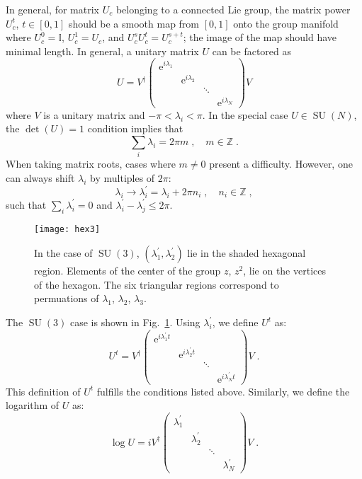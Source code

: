\documentclass[preprint,aps,prd]{revtex4-2}
\newcommand{\da}{\dagger}  %
\newcommand{\be}{\begin{equation}}
\newcommand{\eq}{\end{equation}}
\newcommand{\integer}{\mathbb{Z}}       %
\DeclareMathOperator{\SU}{SU}
\begin{document}
In general, for matrix $U_c$ belonging to a connected Lie group,
the matrix power $U_c^t$, $t\in[0,1]$ should be a
smooth map from $[0,1]$ onto the group manifold where
$U_c^0=\mathbb{I}$, $U_c^1=U_c$, and $U_c^s U_c^t = U_c^{s+t}$;
the image of the map should have minimal length.
In general, a unitary matrix $U$ can be factored as
%
\be
U = V^\da \begin{pmatrix}
    \mathrm{e}^{i \lambda_1} & & &\\
    & \mathrm{e}^{i \lambda_2} & &\\
    & & \ddots & \\
    & & & \mathrm{e}^{i \lambda_N}\end{pmatrix} V
\eq
%
where $V$ is a unitary matrix and $-\pi < \lambda_i < \pi$.
In the special case $U \in \SU(N)$, the $\det(U)=1$ condition implies that
\be
\sum_i \lambda_i = 2 \pi m\;, \quad m\in\integer \;.
\eq
When taking matrix roots, cases where $m\neq 0$ present a
difficulty.  However, one can always shift $\lambda_i$ by
multiples of $2\pi$:
\be
\lambda_i \to \lambda_i^\prime = \lambda_i + 2 \pi n_i\;,\quad
n_i\in\integer \; ,
\eq
such that $\sum_i \lambda_i^\prime = 0$ and
$\lambda_i^\prime - \lambda_j^\prime \le 2 \pi$.
%
\begin{figure}
\texttt{[image: hex3]}
  \caption{In the case of $\SU(3)$, $(\lambda_1^\prime,\lambda_2^\prime)$ lie in the shaded hexagonal region.
    Elements of the center of the group $z$, $z^2$, lie on the vertices of the hexagon. The six triangular regions correspond to permuations of $\lambda_1$, $\lambda_2$, $\lambda_3$.   \label{hexagon}}
\end{figure}
%
The $\SU(3)$ case is shown in Fig.~\ref{hexagon}.
Using $\lambda_i^\prime$, we define $U^t$ as:
\be
U^t = V^\da \begin{pmatrix}
    \mathrm{e}^{i\lambda_1^\prime t} & & &\\
    & \mathrm{e}^{i\lambda_2^\prime t} & &\\
    & & \ddots & \\
    & & & \mathrm{e}^{i\lambda_N^\prime t}\end{pmatrix} V \; .
\eq
This definition of $U^t$ fulfills the conditions listed above.
Similarly, we define the logarithm of $U$ as:
\be
\log U = i V^\da \begin{pmatrix}
    \lambda_1^\prime & & &\\
    & \lambda_2^\prime & &\\
    & & \ddots & \\
    & & & \lambda_N^\prime\end{pmatrix} V \; .
\eq
\end{document}
